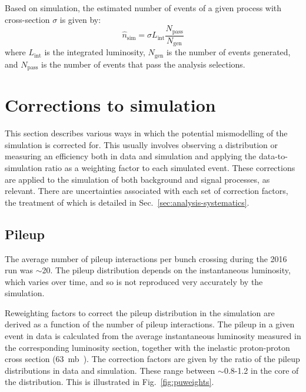 Based on simulation, the estimated number of events of a given process with 
cross-section $\sigma$ is given by:
\begin{equation}
\hat{n}_\mathrm{sim} = \sigma L_\mathrm{int} 
\frac{N_{\mathrm{pass}}}{N_{\mathrm{gen}}}
\end{equation}
where $L_\mathrm{int}$ is the integrated luminosity, $N_{\mathrm{gen}}$ is the 
number of events generated, and $N_{\mathrm{pass}}$ is the number of events 
that pass the analysis selections.


\section{Corrections to simulation}
\label{sec:analysis-mccorrections}
This section describes various ways in which the potential mismodelling of the 
simulation is corrected for. This usually involves observing a distribution or 
measuring an efficiency both in data and simulation and applying the 
data-to-simulation ratio as a weighting factor to each simulated event. These 
corrections are applied to the simulation of both background and signal 
processes, as relevant.
There are uncertainties associated with each set of correction factors, the 
treatment of which is detailed in Sec.~\ref{sec:analysis-systematics}.


\subsection{Pileup}
\label{sec:analysis-mccorrections-pileup}

The average number of pileup interactions per bunch crossing during the 2016 
run was $\sim$20. The pileup distribution depends on the instantaneous 
luminosity, which varies over time, and so is not reproduced very accurately by 
the simulation.

Reweighting factors to correct the pileup distribution in the simulation are 
derived as a function of the number of pileup interactions. The pileup in a 
given event in data is calculated from the average instantaneous luminosity 
measured in the corresponding luminosity section, together with the inelastic 
proton-proton cross section (63~mb~\cite{inelasticxs-atlas13tev}). The 
correction factors are given by the ratio of the pileup distributions in data 
and simulation. These range between $\sim$0.8-1.2 in the core of the 
distribution. This is illustrated in Fig.~\ref{fig:puweights}. 

